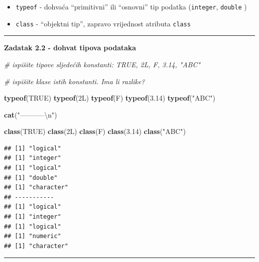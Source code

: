 \documentclass[]{book}
\newenvironment{Shaded}{\begin{snugshade}}{\end{snugshade}}
\newcommand{\KeywordTok}[1]{\textcolor[rgb]{0.13,0.29,0.53}{\textbf{#1}}}
\newcommand{\FloatTok}[1]{\textcolor[rgb]{0.00,0.00,0.81}{#1}}
\newcommand{\CharTok}[1]{\textcolor[rgb]{0.31,0.60,0.02}{#1}}
\newcommand{\StringTok}[1]{\textcolor[rgb]{0.31,0.60,0.02}{#1}}
\newcommand{\CommentTok}[1]{\textcolor[rgb]{0.56,0.35,0.01}{\textit{#1}}}
\newcommand{\OtherTok}[1]{\textcolor[rgb]{0.56,0.35,0.01}{#1}}
\newcommand{\NormalTok}[1]{#1}
\providecommand{\tightlist}{%
  \setlength{\itemsep}{0pt}\setlength{\parskip}{0pt}}
\theoremstyle{definition}
\theoremstyle{definition}
\theoremstyle{definition}
\theoremstyle{remark}
\begin{document}
\begin{itemize}
\tightlist
\item
  \texttt{typeof} - dohvaća ``primitivni'' ili ``osnovni'' tip podatka
  (\texttt{integer}, \texttt{double} )
\item
  \texttt{class} - ``objektni tip'', zapravo vrijednost atributa
  \texttt{class}
\end{itemize}

\begin{center}\rule{0.5\linewidth}{\linethickness}\end{center}

\textbf{Zadatak 2.2 - dohvat tipova podataka}

\begin{Shaded}
\begin{Highlighting}[]
\CommentTok{# ispišite tipove sljedećih konstanti: TRUE, 2L, F, 3.14, "ABC"}

\CommentTok{# ispišite klase istih konstanti. Ima li razlike?}
\end{Highlighting}
\end{Shaded}

\begin{Shaded}
\begin{Highlighting}[]
\KeywordTok{typeof}\NormalTok{(}\OtherTok{TRUE}\NormalTok{)}
\KeywordTok{typeof}\NormalTok{(2L)}
\KeywordTok{typeof}\NormalTok{(F)}
\KeywordTok{typeof}\NormalTok{(}\FloatTok{3.14}\NormalTok{)}
\KeywordTok{typeof}\NormalTok{(}\StringTok{"ABC"}\NormalTok{)}

\KeywordTok{cat}\NormalTok{(}\StringTok{"-----------}\CharTok{\textbackslash{}n}\StringTok{"}\NormalTok{)}

\KeywordTok{class}\NormalTok{(}\OtherTok{TRUE}\NormalTok{)}
\KeywordTok{class}\NormalTok{(2L)}
\KeywordTok{class}\NormalTok{(F)}
\KeywordTok{class}\NormalTok{(}\FloatTok{3.14}\NormalTok{)}
\KeywordTok{class}\NormalTok{(}\StringTok{"ABC"}\NormalTok{)}
\end{Highlighting}
\end{Shaded}

\begin{verbatim}
## [1] "logical"
## [1] "integer"
## [1] "logical"
## [1] "double"
## [1] "character"
## -----------
## [1] "logical"
## [1] "integer"
## [1] "logical"
## [1] "numeric"
## [1] "character"
\end{verbatim}

\begin{center}\rule{0.5\linewidth}{\linethickness}\end{center}
\end{document}
